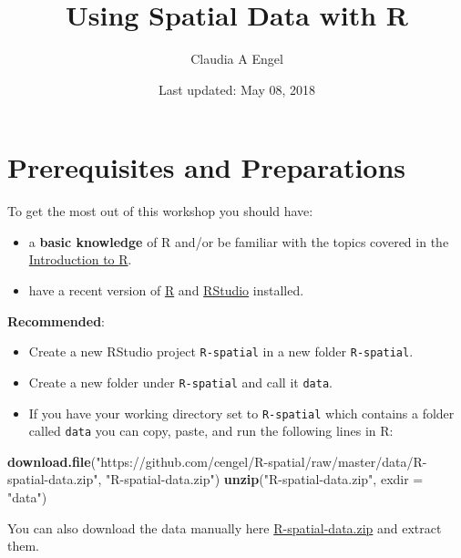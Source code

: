 \documentclass[]{book}
\title{Using Spatial Data with R}
\author{Claudia A Engel}
\date{Last updated: May 08, 2018}
\newenvironment{Shaded}{\begin{snugshade}}{\end{snugshade}}
\newcommand{\KeywordTok}[1]{\textcolor[rgb]{0.13,0.29,0.53}{\textbf{#1}}}
\newcommand{\DataTypeTok}[1]{\textcolor[rgb]{0.13,0.29,0.53}{#1}}
\newcommand{\StringTok}[1]{\textcolor[rgb]{0.31,0.60,0.02}{#1}}
\newcommand{\NormalTok}[1]{#1}
\providecommand{\tightlist}{%
  \setlength{\itemsep}{0pt}\setlength{\parskip}{0pt}}
\theoremstyle{definition}
\theoremstyle{definition}
\theoremstyle{definition}
\theoremstyle{remark}
\begin{document}
\maketitle

{
\setcounter{tocdepth}{1}
\tableofcontents
}
\chapter*{Prerequisites and
Preparations}\label{prerequisites-and-preparations}

To get the most out of this workshop you should have:

\begin{itemize}
\tightlist
\item
  a \textbf{basic knowledge} of R and/or be familiar with the topics
  covered in the \href{https://cengel.github.io/R-intro/}{Introduction
  to R}.
\item
  have a recent version of \href{https://cran.r-project.org/}{R} and
  \href{https://www.rstudio.com/}{RStudio} installed.
\end{itemize}

\textbf{Recommended}:

\begin{itemize}
\item
  Create a new RStudio project \texttt{R-spatial} in a new folder
  \texttt{R-spatial}.
\item
  Create a new folder under \texttt{R-spatial} and call it
  \texttt{data}.
\item
  If you have your working directory set to \texttt{R-spatial} which
  contains a folder called \texttt{data} you can copy, paste, and run
  the following lines in R:
\end{itemize}

\begin{Shaded}
\begin{Highlighting}[]
\KeywordTok{download.file}\NormalTok{(}\StringTok{"https://github.com/cengel/R-spatial/raw/master/data/R-spatial-data.zip"}\NormalTok{, }\StringTok{"R-spatial-data.zip"}\NormalTok{)}
\KeywordTok{unzip}\NormalTok{(}\StringTok{"R-spatial-data.zip"}\NormalTok{, }\DataTypeTok{exdir =} \StringTok{"data"}\NormalTok{)}
\end{Highlighting}
\end{Shaded}

You can also download the data manually here
\href{https://github.com/cengel/R-spatial/raw/master/data/R-spatial-data.zip}{R-spatial-data.zip}
and extract them.
\end{document}

